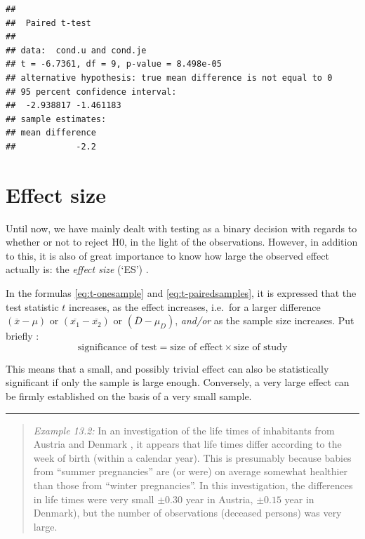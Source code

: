 \documentclass[
]{book}
\begin{document}
\begin{verbatim}
## 
##  Paired t-test
## 
## data:  cond.u and cond.je
## t = -6.7361, df = 9, p-value = 8.498e-05
## alternative hypothesis: true mean difference is not equal to 0
## 95 percent confidence interval:
##  -2.938817 -1.461183
## sample estimates:
## mean difference 
##            -2.2
\end{verbatim}

\hypertarget{sec:ttest-effectsize}{%
\section{Effect size}\label{sec:ttest-effectsize}}

Until now, we have mainly dealt with testing as a binary
decision with regards to whether or not to reject H0, in the light
of the observations. However, in addition to this, it is also of great importance to know how large the observed effect actually is: the \emph{effect size} (`ES') \citep{Cohen88, Thom02, Naka07}.

In the formulas \eqref{eq:t-onesample} and \eqref{eq:t-pairedsamples}, it is expressed that the test statistic \(t\) increases,
as the effect increases,
i.e.~for a larger difference
\((\overline{x}-\mu)\) or \((\overline{x_1}-\overline{x_2})\) or
\((\overline{D}-\mu_D)\),
\emph{and/or} as the sample size increases.
Put briefly \citep[ p.338, formula 11.10]{Rose08}:
\begin{equation}
  \label{eq:Rose08}
    \textrm{significance of test} = 
    \textrm{size of effect} \times \textrm{size of study}
\end{equation}

This means
that a small, and possibly trivial effect can also be
statistically significant if only the sample is large enough.
Conversely, a very large effect can be firmly established on the basis of
a very small sample.

\begin{center}\rule{0.5\linewidth}{0.5pt}\end{center}

\begin{quote}
\emph{Example 13.2:}
In an investigation of the life times of inhabitants from Austria
and Denmark \citep{Dobl99}, it appears that life times differ according to
the week of birth (within a calendar year). This is presumably because babies from ``summer pregnancies''
are (or were) on average somewhat healthier than those
from ``winter pregnancies''. In this investigation, the differences
in life times were very small \(\pm 0.30\) year in Austria, \(\pm 0.15\) year
in Denmark), but the number of observations (deceased persons) was very large.
\end{quote}
\end{document}
